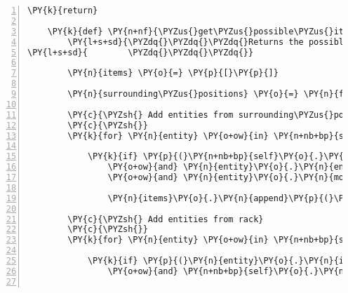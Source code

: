 \begin{Verbatim}[commandchars=\\\{\},numbers=left,firstnumber=1,stepnumber=1]
        \PY{k}{return}

    \PY{k}{def} \PY{n+nf}{\PYZus{}get\PYZus{}possible\PYZus{}items}\PY{p}{(}\PY{n+nb+bp}{self}\PY{p}{,} \PY{n}{attempt\PYZus{}type}\PY{o}{=}\PY{n}{ATTEMPT\PYZus{}USE}\PY{p}{)}\PY{p}{:}
        \PY{l+s+sd}{\PYZdq{}\PYZdq{}\PYZdq{}Returns the possible items for the given interaction type.}
\PY{l+s+sd}{        \PYZdq{}\PYZdq{}\PYZdq{}}

        \PY{n}{items} \PY{o}{=} \PY{p}{[}\PY{p}{]}

        \PY{n}{surrounding\PYZus{}positions} \PY{o}{=} \PY{n}{fabula}\PY{o}{.}\PY{n}{surrounding\PYZus{}positions}\PY{p}{(}\PY{n+nb+bp}{self}\PY{o}{.}\PY{n}{host}\PY{o}{.}\PY{n}{room}\PY{o}{.}\PY{n}{entity\PYZus{}locations}\PY{p}{[}\PY{n+nb+bp}{self}\PY{o}{.}\PY{n}{host}\PY{o}{.}\PY{n}{client\PYZus{}id}\PY{p}{]}\PY{p}{)}

        \PY{c}{\PYZsh{} Add entities from surrounding\PYZus{}positions}
        \PY{c}{\PYZsh{}}
        \PY{k}{for} \PY{n}{entity} \PY{o+ow}{in} \PY{n+nb+bp}{self}\PY{o}{.}\PY{n}{host}\PY{o}{.}\PY{n}{room}\PY{o}{.}\PY{n}{entity\PYZus{}dict}\PY{o}{.}\PY{n}{values}\PY{p}{(}\PY{p}{)}\PY{p}{:}

            \PY{k}{if} \PY{p}{(}\PY{n+nb+bp}{self}\PY{o}{.}\PY{n}{host}\PY{o}{.}\PY{n}{room}\PY{o}{.}\PY{n}{entity\PYZus{}locations}\PY{p}{[}\PY{n}{entity}\PY{o}{.}\PY{n}{identifier}\PY{p}{]} \PY{o+ow}{in} \PY{n}{surrounding\PYZus{}positions}
                \PY{o+ow}{and} \PY{n}{entity}\PY{o}{.}\PY{n}{entity\PYZus{}type} \PY{o+ow}{not} \PY{o+ow}{in} \PY{p}{(}\PY{n}{fabula}\PY{o}{.}\PY{n}{PLAYER}\PY{p}{,} \PY{n}{fabula}\PY{o}{.}\PY{n}{NPC}\PY{p}{)}
                \PY{o+ow}{and} \PY{n}{entity}\PY{o}{.}\PY{n}{mobile}\PY{p}{)}\PY{p}{:}

                \PY{n}{items}\PY{o}{.}\PY{n}{append}\PY{p}{(}\PY{p}{(}\PY{n}{entity}\PY{p}{,} \PY{n}{entity}\PY{o}{.}\PY{n}{identifier}\PY{p}{)}\PY{p}{)}

        \PY{c}{\PYZsh{} Add entities from rack}
        \PY{c}{\PYZsh{}}
        \PY{k}{for} \PY{n}{entity} \PY{o+ow}{in} \PY{n+nb+bp}{self}\PY{o}{.}\PY{n}{host}\PY{o}{.}\PY{n}{rack}\PY{o}{.}\PY{n}{entity\PYZus{}dict}\PY{o}{.}\PY{n}{values}\PY{p}{(}\PY{p}{)}\PY{p}{:}

            \PY{k}{if} \PY{p}{(}\PY{n}{entity}\PY{o}{.}\PY{n}{identifier} \PY{o+ow}{in} \PY{n+nb+bp}{self}\PY{o}{.}\PY{n}{host}\PY{o}{.}\PY{n}{rack}\PY{o}{.}\PY{n}{owner\PYZus{}dict}\PY{o}{.}\PY{n}{keys}\PY{p}{(}\PY{p}{)}
                \PY{o+ow}{and} \PY{n+nb+bp}{self}\PY{o}{.}\PY{n}{host}\PY{o}{.}\PY{n}{rack}\PY{o}{.}\PY{n}{owner\PYZus{}dict}\PY{p}{[}\PY{n}{entity}\PY{o}{.}\PY{n}{identifier}\PY{p}{]} \PY{o}{==} \PY{n+nb+bp}{self}\PY{o}{.}\PY{n}{host}\PY{o}{.}\PY{n}{client\PYZus{}id}\PY{p}{)}\PY{p}{:}


\end{Verbatim}
